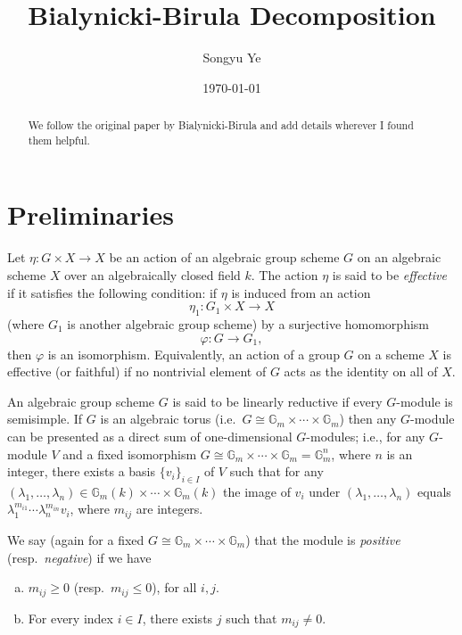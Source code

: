 \documentclass[12pt]{article}
\begin{document}
\rhead{\today}
\cfoot{\thepage}

\title{Bialynicki-Birula Decomposition}

\author{Songyu Ye}
\date{\today}
\maketitle


\begin{abstract}
We follow the original paper by Bialynicki-Birula and add details wherever I found them helpful.
\end{abstract}

\tableofcontents

\section{Preliminaries}
Let $\eta : G \times X \to X$ be an action of an algebraic group scheme $G$ on an algebraic scheme $X$ over an algebraically closed field $k$. The action $\eta$ is said to be \emph{effective} if it satisfies the following condition:  
if $\eta$ is induced from an action 
\[
   \eta_1 : G_1 \times X \longrightarrow X
\]
(where $G_1$ is another algebraic group scheme) by a surjective homomorphism 
\[
   \varphi : G \longrightarrow G_1,
\] 
then $\varphi$ is an isomorphism. Equivalently, an action of a group $G$ on a scheme $X$ is effective (or faithful) if no nontrivial element of $G$ acts as the identity on all of $X$.

An algebraic group scheme $G$ is said to be linearly reductive if every 
$G$-module is semisimple. If $G$ is an algebraic torus (i.e.\ $G \cong \mathbb{G}_m \times \cdots \times \mathbb{G}_m$) 
then any $G$-module can be presented as a direct sum of one-dimensional 
$G$-modules; i.e., for any $G$-module $V$ and a fixed isomorphism 
$G \cong \mathbb{G}_m \times \cdots \times \mathbb{G}_m = \mathbb{G}_m^n$, 
where $n$ is an integer, there exists a basis $\{v_i\}_{i\in I}$ of $V$ such that 
for any $(\lambda_1,\dots,\lambda_n) \in \mathbb{G}_m(k) \times \cdots \times \mathbb{G}_m(k)$ 
the image of $v_i$ under $(\lambda_1,\dots,\lambda_n)$ equals 
$\lambda_1^{m_{i1}} \cdots \lambda_n^{m_{in}} v_i$, where $m_{ij}$ are integers.  

We say (again for a fixed $G \cong \mathbb{G}_m \times \cdots \times \mathbb{G}_m$) 
that the module is \emph{positive} (resp.\ \emph{negative}) if we have
\begin{enumerate}[(a)]
\item $m_{ij} \ge 0$ (resp.\ $m_{ij} \le 0$), for all $i,j$.
\item For every index $i \in I$, there exists $j$ such that $m_{ij} \ne 0$.
\end{enumerate}
\end{document}
